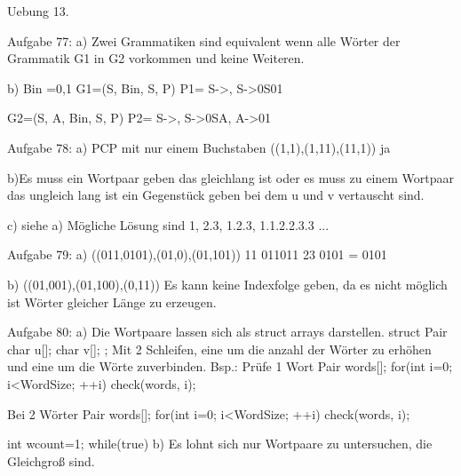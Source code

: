 Uebung 13.

Aufgabe 77:
a)
Zwei Grammatiken sind equivalent wenn alle Wörter der Grammatik G1 in G2 vorkommen
und keine Weiteren.

b)
\Sigma Bin ={0,1} G1=(S, \Sigma Bin, S, P) 
P1={
S->\epsilon,
S->0S01
}

G2=({S, A}, \Sigma Bin, S, P)
P2={
S->\epsilon,
S->0SA,
A->01
}


Aufgabe 78:
a)
PCP mit nur einem Buchstaben
((1,1),(1,11),(11,1))
ja

b)Es muss ein Wortpaar geben das gleichlang ist oder es muss zu einem Wortpaar das ungleich lang ist ein Gegenstück geben bei dem u und v vertauscht sind.

c)
siehe a) Mögliche Lösung sind 1, 2.3, 1.2.3, 1.1.2.2.3.3 ...


Aufgabe 79:
a) ((011,0101),(01,0),(01,101))
11 011011
23 0101 = 0101

b) ((01,001),(01,100),(0,11))
Es kann keine Indexfolge geben, da es nicht möglich ist Wörter gleicher Länge zu erzeugen.


Aufgabe 80:
a)
Die Wortpaare lassen sich als struct arrays darstellen.
struct Pair{
char u[];
char v[];
};
Mit 2 Schleifen, eine um die anzahl der Wörter zu erhöhen und eine um die Wörte zuverbinden.
Bsp.: Prüfe 1 Wort
Pair words[];
for(int i=0; i<WordSize; ++i) check(words, i);

Bei 2 Wörter
Pair words[];
for(int i=0; i<WordSize; ++i) check(words, i);

int wcount=1;
while(true)
{
}
b) Es lohnt sich nur Wortpaare zu untersuchen, die Gleichgroß sind.